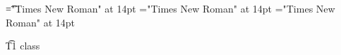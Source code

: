 \documentclass[a4paper]{article}
\begin{document}
 
\pagestyle{plain} 
\font\t="Times New Roman" at 14pt
\font\xt="Times New Roman" at 14pt
\font\vxt="Times New Roman" at 14pt

\pagestyle{fancy} 

\t{T1 class }


\end{document}
